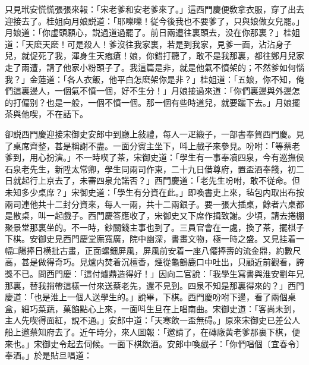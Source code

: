 只見玳安慌慌張張來報：「宋老爹和安老爹來了。」這西門慶便敎拿衣服，穿了出去迎接去了。桂姐向月娘説道：「耶嚛嚛！従今後我也不要爹了，只與娘做女兒罷。」月娘道：「你虚頭願心，説過道過罷了。前日兩遭往裏頭去，没在你那裏？」桂姐道：「天麽天麽！可是殺人！爹沒往我家裏，若是到我家，見爹一面，沾沾身子兒，就促死了我，渾身生天疱瘡！娘，你錯打聽了，敢不是我那裏，都往鄭月兒家走了兩遭，請了他家小粉頭子了。我這篇是非，就是他氣不憤架的；不然爹如何惱我？」金蓮道：「各人衣飯，他平白怎麽架你是非？」桂姐道：「五娘，你不知，俺們這裏邊人，一個氣不憤一個，好不生分！」月娘接過來道：「你們裏邊與外邊怎的打偏别？也是一般，一個不憤一個。那一個有些時道兒，就要躧下去。」月娘擺茶與他喫，不在話下。

卻説西門慶迎接宋御史安郎中到廳上敍禮，每人一疋緞子，一部書奉賀西門慶。見了桌席齊整，甚是稱謝不盡。一面分賓主坐下，呌上戲子來參見。吩咐：「等蔡老爹到，用心扮演。」不一時喫了茶，宋御史道：「學生有一事奉凟四泉，今有巡撫侯石泉老先生，新陞太常卿，學生同兩司作東，二十九日借尊府，置盃酒奉餞，初二日就起行上京去了，未審四泉允諾否？」西門慶道：「老先生吩咐，敢不従命。但未知多少桌席？」宋御史道：「學生有分資在此。」即喚書吏上來，毡包内取出布按兩司連他共十二封分資來，每人一兩，共十二兩銀子。要一張大插桌，餘者六桌都是散桌，叫一起戲子。西門慶答應收了，宋御史又下席作揖致謝。少頃，請去捲棚聚景堂那裏坐的。不一時，鈔關錢主事也到了。三員官會在一處，換了茶，擺棋子下棋。安御史見西門慶堂廡寬廣，院中幽深，書畫文物，極一時之盛。又見挂着一幅□陽捧日横批古畫，正面螺鈿屏風，屏風前安着一座八僊捧壽的流金鼎，約數尺高，甚是做得奇巧。見爐内焚着沉檀香，煙從龜鶴鹿口中吐出，只顧近前觀看，誇獎不已。問西門慶：「這付爐鼎造得好！」因向二官說：「我學生寫書與淮安劉年兄那裏，替我捎帶這樣一付來送蔡老先，還不見到。四泉不知是那裏得來的？」西門慶道：「也是淮上一個人送學生的。」說畢，下棋。西門慶吩咐下邊，看了兩個桌盒，細巧菜蔬，菓餡點心上來，一面呌生旦在上唱南曲。宋御史道：「客尚未到，主人先喫得面紅，說不通。」安郎中道：「天寒飲一盃無碍。」原來宋御史已差公人船上邀蔡知府去了。近午時分，來人囬報：「邀請了，在磚廠黄老爹那裏下棋，便來也。」宋御史令起去伺候。一面下棋飲酒。安郎中喚戯子：「你們唱個〔宜春令〕奉酒。」於是貼旦唱道：

